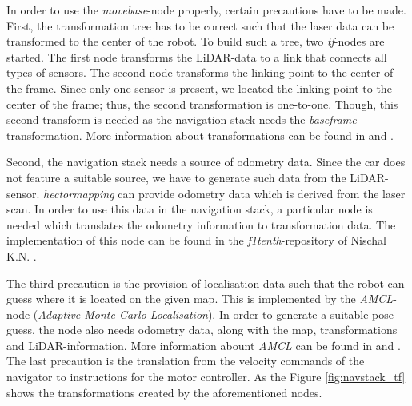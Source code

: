 \documentclass[conference,a4paper]{IEEEtran}
\begin{document}
\noindent In order to use the \emph{move\textunderscore base}-node properly, certain precautions have to be made. First, the transformation tree has to be correct such that the laser data can be transformed to the center of the robot. To build such a tree, two \emph{tf}-nodes are started. The first node transforms the LiDAR-data to a link that connects all types of sensors. The second node transforms the linking point to the center of the frame. Since only one sensor is present, we located the linking point to the center of the frame; thus, the second transformation is one-to-one. Though, this second transform is needed as the navigation stack needs the \emph{base\textunderscore frame}-transformation. More information about transformations can be found in \cite{Kohlbrecher2012_tf} and \cite{Woodall2015}.

Second, the navigation stack needs a source of odometry data. Since the car does not feature a suitable source, we have to generate such data from the LiDAR-sensor. \emph{hector\textunderscore mapping} can provide odometry data which is derived from the laser scan. In order to use this data in the navigation stack, a particular node is needed which translates the odometry information to transformation data. The implementation of this node can be found in the \emph{f1tenth}-repository of Nischal K.N. \cite{K.N.2016}.

The third precaution is the provision of localisation data such that the robot can guess where it is located on the given map. This is implemented by the \emph{AMCL}-node (\emph{Adaptive Monte Carlo Localisation}). In order to generate a suitable pose guess, the node also needs odometry data, along with the map, transformations and LiDAR-information. More information abount \emph{AMCL} can be found in \cite{Gerkey2016} and \cite{Thrun1999}.\\

The last precaution is the translation from the velocity commands of the navigator to instructions for the motor controller. As the 
\noindent Figure \ref{fig:navstack_tf} shows the transformations created by the aforementioned nodes. 
\end{document}
